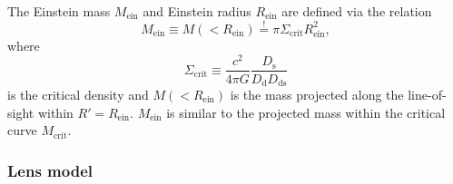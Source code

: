 \documentclass[useAMS,usenatbib]{mnras}
\begin{document}
The Einstein mass $M_\text{ein}$ and Einstein radius $R_\text{ein}$ are defined via the relation
\begin{equation}
M_\text{ein} \equiv M(<R_\text{ein}) \overset{!}{=} \pi \Sigma_\text{crit} R_\text{ein}^2,
\end{equation}
where 
\begin{equation}
\Sigma_\text{crit} \equiv \frac{c^2}{4\pi G} \frac{D_\text{s}}{D_\text{d} D_\text{ds}}
\end{equation}
is the critical density and $M(<R_\text{ein})$ is the mass projected along the line-of-sight within $R'=R_\text{ein}$. $M_\text{ein}$ is similar to the projected mass within the critical curve $M_\text{crit}$.

\subsubsection{Lens model} 
\end{document}
